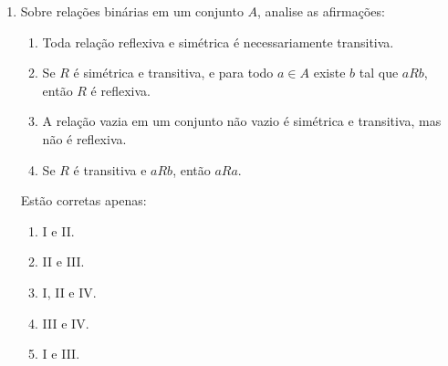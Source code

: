 \documentclass[12pt]{article}
\begin{document}
\begin{enumerate}
\item Sobre relações binárias em um conjunto $A$, analise as afirmações:

\begin{enumerate}[label=\Roman*.]
    \item Toda relação reflexiva e simétrica é necessariamente transitiva.
    \item Se $R$ é simétrica e transitiva, e para todo $a \in A$ existe $b$ tal que $aRb$, então $R$ é reflexiva.
    \item A relação vazia em um conjunto não vazio é simétrica e transitiva, mas não é reflexiva.
    \item Se $R$ é transitiva e $aRb$, então $aRa$.
\end{enumerate}

Estão corretas apenas:
\begin{enumerate}[label=\Alph*)]
    \item I e II.
    \item II e III.
    \item I, II e IV.
    \item III e IV.
    \item I e III.
\end{enumerate}

\end{enumerate}
\end{document}
